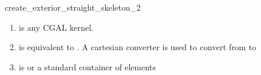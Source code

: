 \begin{ccRefFunction}{create_exterior_straight_skeleton_2}
\begin{enumerate}  
   \item    {} is any CGAL kernel.
   \item    {} is equivalent to .
            A cartesian converter is used to convert from  to 
   \item    {} is  or a standard container of  elements 
\end{enumerate}


\ccSeeAlso
{}\\
 \\

\end{ccRefFunction}


